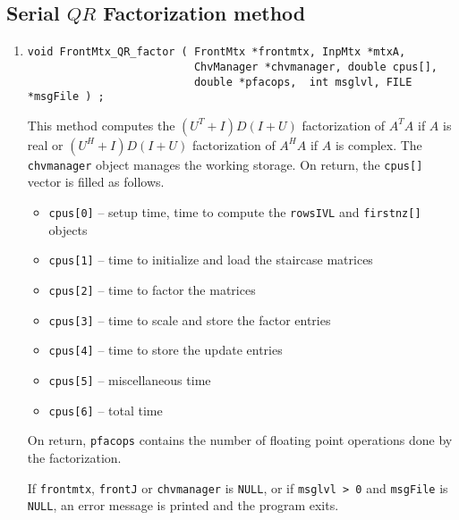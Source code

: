 \subsection{Serial $QR$ Factorization method}
\label{subsection:FrontMtx:proto:factorQR}
\par
\begin{enumerate}
\item
\begin{verbatim}
void FrontMtx_QR_factor ( FrontMtx *frontmtx, InpMtx *mtxA, 
                          ChvManager *chvmanager, double cpus[], 
                          double *pfacops,  int msglvl, FILE *msgFile ) ;
\end{verbatim}
This method computes the
$(U^T+I)D(I+U)$ factorization of $A^TA$ if $A$ is real
or
$(U^H+I)D(I+U)$ factorization of $A^HA$ if $A$ is complex.
The {\tt chvmanager} object manages the working storage.
On return, the {\tt cpus[]} vector is filled as follows.
\begin{itemize}
\item 
{\tt cpus[0]} -- setup time, time to compute the {\tt rowsIVL} 
and {\tt firstnz[]} objects
\item 
{\tt cpus[1]} -- time to initialize and load the staircase matrices
\item 
{\tt cpus[2]} -- time to factor the matrices
\item 
{\tt cpus[3]} -- time to scale and store the factor entries
\item 
{\tt cpus[4]} -- time to store the update entries
\item 
{\tt cpus[5]} -- miscellaneous time
\item 
{\tt cpus[6]} -- total time
\end{itemize}
On return, {\tt *pfacops} contains the number of floating point
operations done by the factorization.
\par {}
If {\tt frontmtx}, {\tt frontJ} or {\tt chvmanager} is {\tt NULL},
or if {\tt msglvl > 0} and {\tt msgFile} is {\tt NULL},
an error message is printed and the program exits.
\end{enumerate}
\par
